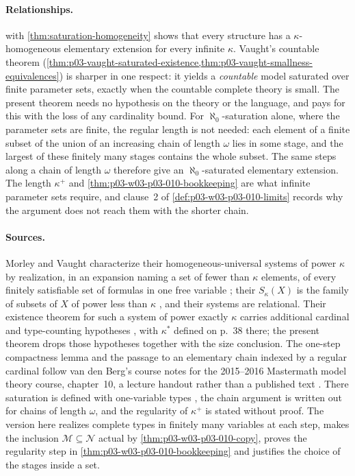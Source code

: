 \paragraph{Relationships.}
 with
\cref{thm:saturation-homogeneity} shows that every structure has a
\(\kappa\)-homogeneous elementary extension for every infinite \(\kappa\).
Vaught's countable theorem
(\cref{thm:p03-vaught-saturated-existence,thm:p03-vaught-smallness-equivalences})
is sharper in one respect: it yields a \emph{countable} model saturated
over finite parameter sets, exactly when the countable complete theory is
small.  The present theorem needs no hypothesis on the theory or the
language, and pays for this with the loss of any cardinality bound.  For
\(\aleph_0\)-saturation alone, where the parameter sets are finite, the
regular length is not needed: each element of a finite subset of the union
of an increasing chain of length \(\omega\) lies in some stage, and the
largest of these finitely many stages contains the whole subset.  The same
steps along a chain of length \(\omega\) therefore give an
\(\aleph_0\)-saturated elementary extension.  The length \(\kappa^+\) and
\cref{thm:p03-w03-p03-010-bookkeeping} are what infinite parameter sets
require, and clause~2 of \cref{def:p03-w03-p03-010-limits} records why the
argument does not reach them with the shorter chain.

\paragraph{Sources.}
Morley and Vaught characterize their homogeneous-universal systems of
power \(\kappa\) by realization, in an expansion naming a set of fewer
than \(\kappa\) elements, of every finitely satisfiable set of formulas in
one free variable \cite[p.~49, Theorem~3.4]{MorleyVaught1962}; their
\(S_\kappa(X)\) is the family of subsets of \(X\) of power less than
\(\kappa\) \cite[p.~39]{MorleyVaught1962}, and their systems are
relational.  Their existence
theorem for such a system of power exactly \(\kappa\) carries additional
cardinal and type-counting hypotheses
\cite[p.~49, Theorem~3.5]{MorleyVaught1962}, with \(\kappa^*\) defined
on p.~38 there; the present theorem drops those hypotheses together with
the size conclusion.  The one-step compactness lemma and the passage to an
elementary chain indexed by a regular cardinal follow van den Berg's
course notes for the 2015--2016 Mastermath model theory course, chapter~10,
a lecture handout rather than a published text
\cite[ch.~10, pp.~2--3, Theorem~10.4 and Lemma~10.5]{vandenBerg2016ModelTheoryCh10}.
There saturation is defined with one-variable types
\cite[ch.~10, p.~1, Definition~10.1]{vandenBerg2016ModelTheoryCh10}, the
chain argument is written out for chains of length \(\omega\), and the
regularity of \(\kappa^+\) is stated without proof.  The version here realizes complete types in finitely many
variables at each step, makes the inclusion \(\mathcal M\subseteq\mathcal N\)
actual by \cref{thm:p03-w03-p03-010-copy}, proves the regularity step in
\cref{thm:p03-w03-p03-010-bookkeeping} and justifies the choice of the
stages inside a set.
